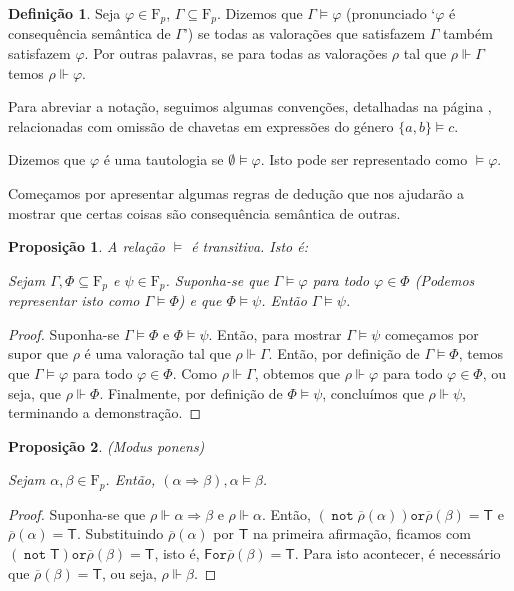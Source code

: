 \documentclass{report}
\newtheorem{prop}{Proposição}
\theoremstyle{definition}
\newtheorem{definicao}{Definição}
\theoremstyle{remark}
\newcommand{\F}{\mathrm{F}}
\newcommand{\lt}{\mathsf{T}}
\newcommand{\lf}{\mathsf{F}}
\DeclareMathOperator{\pnot}{\texttt{not}}
\newcommand{\por}{\mathbin{\texttt{or}}}
\newcommand{\imply}{\mathbin{\Rightarrow}}
\begin{document}
	\begin{definicao}\label{def:prop:consequenciasemantica}
	Seja $\varphi \in \F_p$, $\Gamma \subseteq \F_p$. Dizemos que $\Gamma \vDash \varphi$ (pronunciado `$\varphi$ é consequência semântica de $\Gamma$') se todas as valorações que satisfazem $\Gamma$ também satisfazem $\varphi$. Por outras palavras, se para todas as valorações $\rho$ tal que $\rho \Vdash \Gamma$ temos $\rho \Vdash \varphi$.
	
	Para abreviar a notação, seguimos algumas convenções, detalhadas na página \pageref{convencao:consequencia}, relacionadas com omissão de chavetas em expressões do género $\{a, b\} \vDash c$.
	
	Dizemos que $\varphi$ é uma tautologia se $\emptyset \vDash \varphi$. Isto pode ser representado como $\vDash \varphi$.
	\end{definicao}
	
	Começamos por apresentar algumas regras de dedução que nos ajudarão a mostrar que certas coisas são consequência semântica de outras.
	
	\begin{prop}
	A relação $\vDash$ é transitiva. Isto é:
	
	Sejam $\Gamma, \Phi \subseteq \F_p$ e $\psi \in \F_p$. Suponha-se que $\Gamma \vDash \varphi$ para todo $\varphi \in \Phi$ (Podemos representar isto como $\Gamma \vDash \Phi$) e que $\Phi \vDash \psi$. Então $\Gamma \vDash \psi$.
	\end{prop}
	
	\begin{proof} Suponha-se $\Gamma \vDash \Phi$ e $\Phi \vDash \psi$. Então, para mostrar $\Gamma \vDash \psi$ começamos por supor que $\rho$ é uma valoração tal que $\rho \Vdash \Gamma$. Então, por definição de $\Gamma \vDash \Phi$, temos que $\Gamma \vDash \varphi$ para todo $\varphi \in \Phi$. Como $\rho \Vdash \Gamma$, obtemos que $\rho \Vdash \varphi$ para todo $\varphi \in \Phi$, ou seja, que $\rho \Vdash \Phi$. Finalmente, por definição de $\Phi \vDash \psi$, concluímos que $\rho \Vdash \psi$, terminando a demonstração.
	\end{proof}
	
	\begin{prop}\label{prop:mp} (\textit{Modus ponens}) 
	
	Sejam $\alpha, \beta \in \F_p$. Então, $(\alpha \imply \beta), \alpha \vDash \beta$.
	\end{prop}
	
	\begin{proof}
	Suponha-se que $\rho \Vdash \alpha \imply \beta$ e $\rho \Vdash \alpha$. Então, $(\pnot\overline\rho(\alpha))\por\overline\rho(\beta) = \lt$ e $\overline\rho(\alpha) = \lt$. Substituindo $\overline\rho(\alpha)$ por $\lt$ na primeira afirmação, ficamos com $(\pnot\lt)\por\overline\rho(\beta) = \lt$, isto é, $\lf \por \overline\rho(\beta) = \lt$. Para isto acontecer, é necessário que $\overline\rho(\beta) = \lt$, ou seja, $\rho \Vdash \beta$.
	\end{proof}
	
\end{document}

